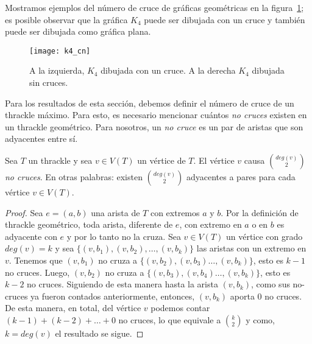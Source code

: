 Mostramos ejemplos del número de cruce de gráficas geométricas en la
figura~\ref{fig:k4_cn}; es posible observar que la gráfica $K_4$ puede ser dibujada con
un cruce y también puede ser dibujada como gráfica plana.
\begin{figure}[h]
  \centering
  \texttt{[image: k4\_cn]}
  \caption{A la izquierda, $K_4$ dibujada con un cruce. A la derecha $K_4$ dibujada sin
  cruces.}
  \label{fig:k4_cn}
\end{figure}

Para los resultados de esta sección, debemos definir el número de cruce de un thrackle
máximo. Para esto, es necesario mencionar cuántos \emph{no cruces} existen en un thrackle
geométrico. Para nosotros, un \emph{no cruce} es un par de aristas que son adyacentes
entre sí.

\begin{lemma} \label{lema:nocruces}
  Sea $T$ un thrackle y sea $v\in V(T)$ un vértice de $T$. El vértice $v$ causa $\binom{deg(v)}{2}$ \emph{no cruces}. En otras palabras: existen $\binom{deg(v)}{2}$ adyacentes a pares para cada vértice $v\in V(T)$.
\end{lemma}
\begin{proof}
  Sea $e=(a,b)$ una arista de $T$ con extremos $a$ y $b$. Por la definición de thrackle
  geométrico, toda arista, diferente de $e$, con extremo en $a$ o en $b$ es adyacente con
  $e$ y por lo tanto no la cruza. Sea $v\in V(T)$ un vértice con grado $deg(v)=k$ y sea
  $\{(v,b_1),(v,b_2),\dots,(v,b_k)\}$ las aristas con un extremo en $v$. Tenemos que
  $(v,b_1)$ no cruza a $\{(v,b_2),(v,b_3)\dots,(v,b_k)\}$, esto es $k-1$ no cruces.
  Luego, $(v,b_2)$ no cruza a $\{(v,b_3),(v,b_4)\dots,(v,b_k)\}$, esto es $k-2$ no cruces. Siguiendo de esta manera hasta la arista $(v,b_k)$, como sus no-cruces ya fueron contados anteriormente, entonces, $(v,b_k)$ aporta 0 no cruces. De esta manera, en total, del vértice $v$ podemos contar $(k-1)+(k-2)+\dots+0$ no cruces, lo que equivale a $\binom{k}{2}$ y como, $k=deg(v)$ el resultado se sigue.
\end{proof}

